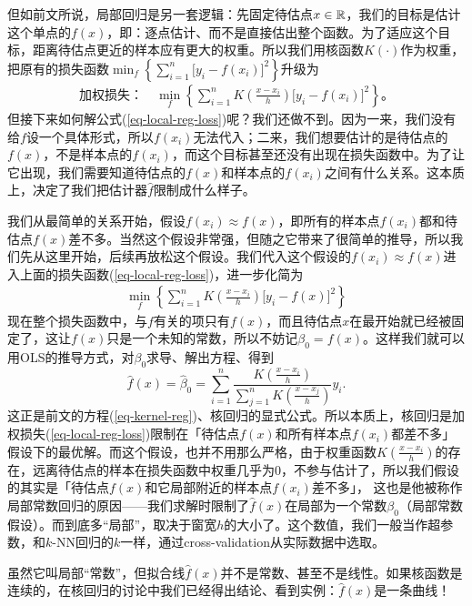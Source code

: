\documentclass[10pt]{notes}
\begin{document}
但如前文所说，局部回归是另一套逻辑：先固定待估点$x\in\mathbb{R}$，我们的目标是估计这个单点的$f(x)$，即：逐点估计、而不是直接估出整个函数。为了适应这个目标，距离待估点更近的样本应有更大的权重。所以我们用核函数$K(\cdot)$作为权重，把原有的损失函数$\min_{f}
    \left\{\sum_{i=1}^{n}\big[y_i-f(x_i)\big]^2\right\}$升级为
\begin{align}
    \text{加权损失：}\quad 
    \min_{f}
    \left\{\sum_{i=1}^{n}K\!\left(\frac{x-x_i}{h}\right)\big[y_i-f(x_i)\big]^2\right\}\text{。}
    \label{eq-local-reg-loss}
\end{align}
但接下来如何解公式(\ref{eq-local-reg-loss})呢？我们还做不到。因为一来，我们没有给$f$设一个具体形式，所以$f(x_i)$无法代入；二来，我们想要估计的是待估点的$f(x)$，不是样本点的$f(x_i)$，而这个目标甚至还没有出现在损失函数中。为了让它出现，我们需要知道待估点的$f(x)$和样本点的$f(x_i)$之间有什么关系。这本质上，决定了我们把估计器$\hat{f}$限制成什么样子。

我们从最简单的关系开始，假设$f(x_i)\approx f(x)$，即所有的样本点$f(x_i)$都和待估点$f(x)$差不多。当然这个假设非常强，但随之它带来了很简单的推导，所以我们先从这里开始，后续再放松这个假设。我们代入这个假设的$f(x_i)\approx f(x)$进入上面的损失函数(\ref{eq-local-reg-loss})，进一步化简为
\begin{align*}
    \min_{f}
    \left\{\sum_{i=1}^{n}K\!\left(\frac{x-x_i}{h}\right)\big[y_i-f(x)\big]^2\right\}
\end{align*}
现在整个损失函数中，与$f$有关的项只有$f(x)$，而且待估点$x$在最开始就已经被固定了，这让$f(x)$只是一个未知的常数，所以不妨记$\beta_0=f(x)$。这样我们就可以用OLS的推导方式，对$\beta_0$求导、解出方程、得到
$$\hat{f}(x)=\hat{\beta}_0=\sum_{i=1}^{n}\frac{K\!\left(\frac{x-x_i}{h}\right)}{\sum_{j=1}^{n}K\!\left(\frac{x-x_j}{h}\right)}y_i.$$
这正是前文的方程(\ref{eq-kernel-reg})、核回归的显式公式。所以本质上，核回归是加权损失(\ref{eq-local-reg-loss})限制在「待估点$f(x)$和所有样本点$f(x_i)$都差不多」假设下的最优解。而这个假设，也并不用那么严格，由于权重函数$K\!\left(\frac{x-x_i}{h}\right)$的存在，远离待估点的样本在损失函数中权重几乎为0，不参与估计了，所以我们假设的其实是「待估点$f(x)$和它局部附近的样本点$f(x_i)$差不多」，
这也是他被称作局部常数回归的原因——我们求解时限制了$\hat{f}(x)$在局部为一个常数$\beta_0$（局部常数假设）。而到底多“局部”，取决于窗宽$h$的大小了。这个数值，我们一般当作超参数，和$k$-NN回归的$k$一样，通过cross-validation从实际数据中选取。
\begin{remark}
    虽然它叫局部“常数”，但拟合线$\hat{f}(x)$并不是常数、甚至不是线性。如果核函数是连续的，在核回归的讨论中我们已经得出结论、看到实例：$\hat{f}(x)$是一条曲线！
\end{remark}
\end{document}
